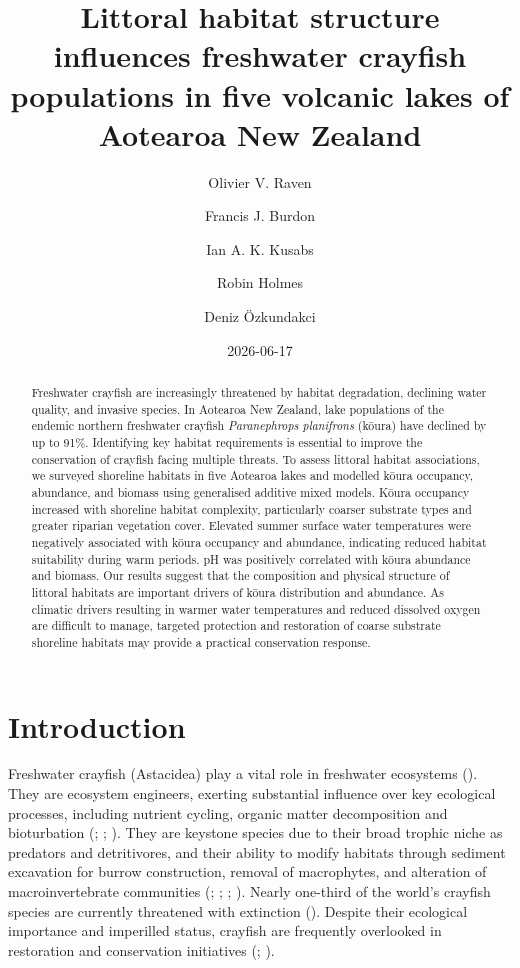 \documentclass[
  letterpaper,
  DIV=11,
  numbers=noendperiod]{scrartcl}
\title{Littoral habitat structure influences freshwater crayfish
populations in five volcanic lakes of Aotearoa New Zealand}
\author{Olivier V. Raven \and Francis J. Burdon \and Ian A. K.
Kusabs \and Robin Holmes \and Deniz Özkundakci}
\date{2026-06-17}
\renewcommand*\contentsname{Table of contents}
\newcommand\contentsname{Table of contents}
\begin{document}
\maketitle
\begin{abstract}
Freshwater crayfish are increasingly threatened by habitat degradation,
declining water quality, and invasive species. In Aotearoa New Zealand,
lake populations of the endemic northern freshwater crayfish
\emph{Paranephrops planifrons} (kōura) have declined by up to 91\%.
Identifying key habitat requirements is essential to improve the
conservation of crayfish facing multiple threats. To assess littoral
habitat associations, we surveyed shoreline habitats in five Aotearoa
lakes and modelled kōura occupancy, abundance, and biomass using
generalised additive mixed models. Kōura occupancy increased with
shoreline habitat complexity, particularly coarser substrate types and
greater riparian vegetation cover. Elevated summer surface water
temperatures were negatively associated with kōura occupancy and
abundance, indicating reduced habitat suitability during warm periods.
pH was positively correlated with kōura abundance and biomass. Our
results suggest that the composition and physical structure of littoral
habitats are important drivers of kōura distribution and abundance. As
climatic drivers resulting in warmer water temperatures and reduced
dissolved oxygen are difficult to manage, targeted protection and
restoration of coarse substrate shoreline habitats may provide a
practical conservation response.
\end{abstract}

\renewcommand*\contentsname{Table of contents}
{
\setcounter{tocdepth}{3}
\tableofcontents
}

\section{Introduction}\label{introduction}

Freshwater crayfish (Astacidea) play a vital role in freshwater
ecosystems (). They are ecosystem
engineers, exerting substantial influence over key ecological processes,
including nutrient cycling, organic matter decomposition and
bioturbation (;
;
). They are keystone
species due to their broad trophic niche as predators and detritivores,
and their ability to modify habitats through sediment excavation for
burrow construction, removal of macrophytes, and alteration of
macroinvertebrate communities (; ;
;
). Nearly
one-third of the world's crayfish species are currently threatened with
extinction (). Despite
their ecological importance and imperilled status, crayfish are
frequently overlooked in restoration and conservation initiatives
(;
).
\end{document}
